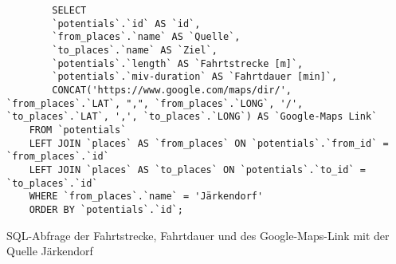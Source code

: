 \begin{listing}[htbp]
    \begin{verbatim}
        SELECT 
        `potentials`.`id` AS `id`, 
        `from_places`.`name` AS `Quelle`,
        `to_places`.`name` AS `Ziel`, 
        `potentials`.`length` AS `Fahrtstrecke [m]`, 
        `potentials`.`miv-duration` AS `Fahrtdauer [min]`,
        CONCAT('https://www.google.com/maps/dir/', `from_places`.`LAT`, ",", `from_places`.`LONG`, '/', `to_places`.`LAT`, ',', `to_places`.`LONG`) AS `Google-Maps Link`
    FROM `potentials`
    LEFT JOIN `places` AS `from_places` ON `potentials`.`from_id` = `from_places`.`id`
    LEFT JOIN `places` AS `to_places` ON `potentials`.`to_id` = `to_places`.`id`
    WHERE `from_places`.`name` = 'Järkendorf'
    ORDER BY `potentials`.`id`;
    \end{verbatim}
    \caption{SQL-Abfrage der Fahrtstrecke, Fahrtdauer und des Google-Maps-Link mit der Quelle Järkendorf}\label{lst-f-jaerkendorf}
\end{listing}